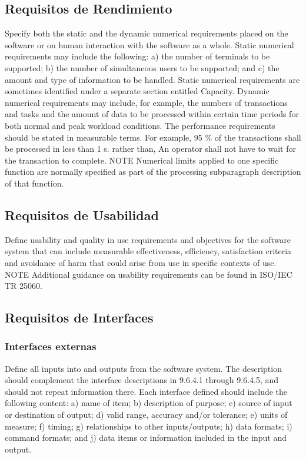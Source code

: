 \documentclass[12pt, a4paper, twoside]{article}
\begin{document}
\subsection{Requisitos de Rendimiento}
Specify both the static and the dynamic numerical requirements placed on the software or on human
interaction with the software as a whole.
Static numerical requirements may include the following:
a) the number of terminals to be supported;
b) the number of simultaneous users to be supported; and
c) the amount and type of information to be handled.
Static numerical requirements are sometimes identified under a separate section entitled Capacity.
Dynamic numerical requirements may include, for example, the numbers of transactions and tasks and
the amount of data to be processed within certain time periods for both normal and peak workload
conditions.
The performance requirements should be stated in measurable terms.
For example,
95 \% of the transactions shall be processed in less than 1 s.
rather than,
An operator shall not have to wait for the transaction to complete.
NOTE Numerical limits applied to one specific function are normally specified as part of the processing
subparagraph description of that function.

\subsection{Requisitos de Usabilidad}
Define usability and quality in use requirements and objectives for the software system that can include
measurable effectiveness, efficiency, satisfaction criteria and avoidance of harm that could arise from
use in specific contexts of use.
NOTE Additional guidance on usability requirements can be found in ISO/IEC TR 25060.

\subsection{Requisitos de Interfaces}

 \subsubsection{Interfaces externas}
 Define all inputs into and outputs from the software system. The description should complement the
 interface descriptions in 9.6.4.1 through 9.6.4.5, and should not repeat information there.
 Each interface defined should include the following content:
 a) name of item;
 b) description of purpose;
 c) source of input or destination of output;
 d) valid range, accuracy and/or tolerance;
 e) units of measure;
 f) timing;
 g) relationships to other inputs/outputs;
 h) data formats;
 i) command formats; and
 j) data items or information included in the input and output.
\end{document}
